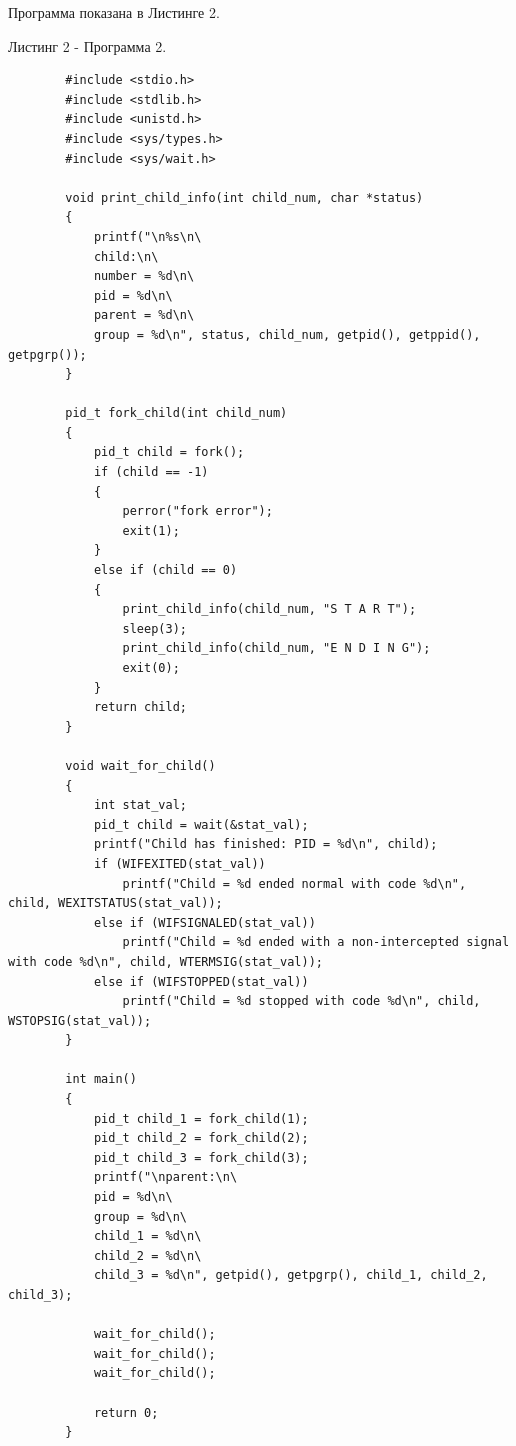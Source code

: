 \documentclass[14pt, a4paper]{extarticle}
\begin{document}
	Программа показана в Листинге 2.\par
	Листинг 2 - Программа 2.
	\begin{lstlisting}		
		#include <stdio.h>
		#include <stdlib.h>
		#include <unistd.h>
		#include <sys/types.h>
		#include <sys/wait.h>
		
		void print_child_info(int child_num, char *status)
		{
			printf("\n%s\n\
			child:\n\
			number = %d\n\
			pid = %d\n\
			parent = %d\n\
			group = %d\n", status, child_num, getpid(), getppid(), getpgrp());
		}
		
		pid_t fork_child(int child_num)
		{
			pid_t child = fork();
			if (child == -1)
			{
				perror("fork error");
				exit(1);
			}
			else if (child == 0)
			{
				print_child_info(child_num, "S T A R T");
				sleep(3);
				print_child_info(child_num, "E N D I N G");
				exit(0);
			}
			return child;
		}
		
		void wait_for_child()
		{
			int stat_val;
			pid_t child = wait(&stat_val);
			printf("Child has finished: PID = %d\n", child);
			if (WIFEXITED(stat_val))
				printf("Child = %d ended normal with code %d\n", child, WEXITSTATUS(stat_val));
			else if (WIFSIGNALED(stat_val))
				printf("Child = %d ended with a non-intercepted signal with code %d\n", child, WTERMSIG(stat_val));
			else if (WIFSTOPPED(stat_val))
				printf("Child = %d stopped with code %d\n", child, WSTOPSIG(stat_val));
		}
		
		int main()
		{
			pid_t child_1 = fork_child(1);
			pid_t child_2 = fork_child(2);
			pid_t child_3 = fork_child(3);			
			printf("\nparent:\n\
			pid = %d\n\
			group = %d\n\
			child_1 = %d\n\
			child_2 = %d\n\
			child_3 = %d\n", getpid(), getpgrp(), child_1, child_2, child_3);
			
			wait_for_child();
			wait_for_child();
			wait_for_child();
			
			return 0;
		}
	\end{lstlisting}
\end{document}
